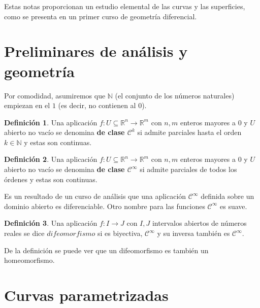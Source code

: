 \documentclass{article}
\author{NyKi}
\date{Enero 2025-}
\theoremstyle{definition}
\newtheorem{define}{Definición}
\newcommand{\reales}{\mathbb{R}}
\newcommand{\naturales}{\mathbb{N}}
\newcommand{\cinfinito}{\mathcal{C}^{\infty}}
\newcommand{\claseck}[1]{\mathcal{C}^{#1}}
\begin{document}
Estas notas proporcionan un estudio elemental de las curvas y las superficies, como se presenta en un primer curso de geometría diferencial.

\section{Preliminares de análisis y geometría}
Por comodidad, asumiremos que $\naturales$ (el conjunto de los números naturales) empiezan en el $1$ (es decir, no contienen al $0$).

\begin{define}
	Una aplicación $f:U\subseteq\reales^n \rightarrow \reales^m$ con $n,m$ enteros mayores a 0 y $U$ abierto no vacío se denomina \textbf{de clase $\claseck{k}$} si admite parciales hasta el orden $k \in \naturales$ y estas son continuas.
\end{define}
\begin{define}
	Una aplicación $f:U\subseteq\reales^n \rightarrow \reales^m$ con $n,m$ enteros mayores a 0 y $U$ abierto no vacío se denomina \textbf{de clase $\cinfinito$} si admite parciales de todos los órdenes y estas son continuas.
\end{define}
Es un resultado de un curso de análisis que una aplicación $\cinfinito$ definida sobre un dominio abierto es diferenciable. Otro nombre para las funciones $\cinfinito$ es suave.
\begin{define}
	Una aplicación $f:I \rightarrow J$ con $I,J$ intervalos abiertos de números reales se dice $difeomorfismo$ si es biyectiva, $\cinfinito$ y su inversa también es $\cinfinito$.
\end{define}
De la definición se puede ver que un difeomorfismo es también un homeomorfismo.

\section{Curvas parametrizadas}
\end{document}
